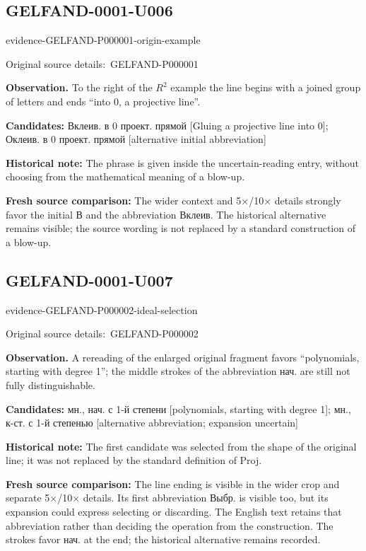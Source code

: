 \documentclass[11pt]{article}
\newcommand{\EvidenceBlock}[4]{%
 \par\smallskip\noindent\begin{minipage}{\linewidth}
 \begin{minipage}[t]{.47\linewidth}\vspace{0pt}\centering
 \csname evidence-#1-#2\endcsname\par
 {\scriptsize\SourceCropCaption\ #1}\par
 \end{minipage}\hfill
 \begin{minipage}[t]{.49\linewidth}\vspace{0pt}\raggedright
 {\small\color{orange!65!black}\textbf{#4} #3}\par
 \end{minipage}
 \end{minipage}\par\smallskip}
\newcommand{\SourceCropCaption}{Original source details:}\newcommand{\ReadingCaption}{Uncertain reading.}\newcommand{\IncompleteCaption}{Undeciphered passage.}\newcommand{\DiagramCaption}{Diagram and typed description.}
\begin{document}
\subsection*{GELFAND-0001-U006}
\EvidenceBlock{GELFAND-P000001}{origin-example}{To the right of the \(R^2\) example the line begins with a joined group of letters and ends “into 0, a projective line”.}{Observation.}
\par\smallskip\noindent\textbf{Candidates: } Вклеив. в 0 проект. прямой [Gluing a projective line into 0]; Оклеив. в 0 проект. прямой [alternative initial abbreviation]\par
\par\smallskip\noindent\textbf{Historical note: } The phrase is given inside the uncertain-reading entry, without choosing from the mathematical meaning of a blow-up.\par
\par\smallskip\noindent\textbf{Fresh source comparison: } The wider context and 5×/10× details strongly favor the initial В and the abbreviation Вклеив. The historical alternative remains visible; the source wording is not replaced by a standard construction of a blow-up.\par

\subsection*{GELFAND-0001-U007}
\EvidenceBlock{GELFAND-P000002}{ideal-selection}{A rereading of the enlarged original fragment favors “polynomials, starting with degree 1”; the middle strokes of the abbreviation нач. are still not fully distinguishable.}{Observation.}
\par\smallskip\noindent\textbf{Candidates: } мн., нач. с 1-й степени [polynomials, starting with degree 1]; мн., к-ст. с 1-й степенью [alternative abbreviation; expansion uncertain]\par
\par\smallskip\noindent\textbf{Historical note: } The first candidate was selected from the shape of the original line; it was not replaced by the standard definition of Proj.\par
\par\smallskip\noindent\textbf{Fresh source comparison: } The line ending is visible in the wider crop and separate 5×/10× details. Its first abbreviation Выбр. is visible too, but its expansion could express selecting or discarding. The English text retains that abbreviation rather than deciding the operation from the construction. The strokes favor нач. at the end; the historical alternative remains recorded.\par
\end{document}
